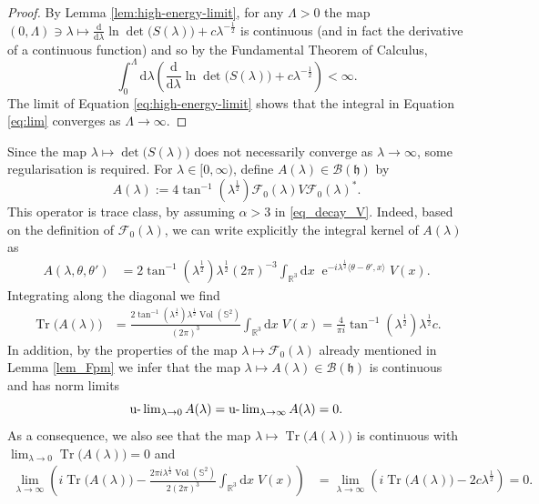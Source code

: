 \documentclass{article}
\def\B{\mathscr B}
\def\d{\mathrm{d}}
\def\F{\mathscr F}
\def\R{\mathbb R}
\def\S{\mathbb S}
\def\HS{\mathfrak h}
\def\e{\mathop{\mathrm{e}}\nolimits}
\def\ulim{\mathop{\hbox{\rm u-}\lim}\nolimits}
\def\Tr{\mathop{\mathrm{Tr}}\nolimits}
\def\vol{\mathop{\mathrm{Vol}}\nolimits}
\begin{document}
\begin{proof}
By Lemma \ref{lem:high-energy-limit}, for any $\Lambda > 0$ the map $(0,\Lambda) \ni \lambda \mapsto \frac{\d}{\d \lambda} \ln\det\big(S(\lambda)\big) + c \lambda^{-\frac12}$ is continuous (and in fact the derivative of a continuous function) and so by the Fundamental Theorem of Calculus,
\begin{equation}\label{eq:lim}
\int_0^\Lambda \d \lambda \left(\frac{\d}{\d \lambda} \ln\det\big(S(\lambda)\big) + c \lambda^{-\frac12} \right) < \infty.
\end{equation}
The limit of Equation \eqref{eq:high-energy-limit} shows that the integral in Equation \eqref{eq:lim} converges as $\Lambda \to \infty$.
\end{proof}

Since the map $\lambda \mapsto \det\big(S(\lambda)\big)$ does not necessarily converge as $\lambda \to \infty$, some regularisation is required. For $\lambda \in [0,\infty)$, define $A(\lambda) \in \B(\HS)$ by
\begin{equation*}
A(\lambda) := 4 \tan^{-1}(\lambda^\frac12) \F_0(\lambda) V \F_0(\lambda)^*.
\end{equation*}
This operator is trace class, by assuming $\alpha > 3$ in \eqref{eq_decay_V}.
Indeed, based on the definition of $\F_0(\lambda)$, we can write explicitly the integral kernel of $A(\lambda)$ as
\begin{align*}
A(\lambda,\theta,\theta') &= 2 \tan^{-1}(\lambda^\frac12 ) \lambda^\frac12 (2\pi)^{-3}  \int_{\R^3}  
\d x\;\!\e^{-i \lambda^\frac12 \langle \theta - \theta', x \rangle } V(x)  .
\end{align*}
Integrating along the diagonal we find
\begin{align*}
\Tr\big(A(\lambda)\big) &= \frac{2 \tan^{-1}(\lambda^\frac12) \lambda^\frac12 \vol(\S^2)}{(2\pi)^3} \int_{\R^3} \d x\;\!V(x)  
= \frac{4}{\pi i} \tan^{-1}(\lambda^\frac12) \lambda^\frac12 c.
\end{align*}
In addition, by the properties of the map $\lambda \mapsto \F_0(\lambda)$  already mentioned in Lemma \ref{lem_Fpm} we infer that the map $\lambda \mapsto A(\lambda) \in \B(\HS)$ is continuous and has norm limits 
$$
\ulim_{\lambda \to 0} A(\lambda) = \ulim_{\lambda \to \infty} A(\lambda) = 0. 
$$
As a consequence, we also see that the map $\lambda \mapsto \Tr\big(A(\lambda)\big)$ is continuous with $\lim_{\lambda \to 0} \Tr\big(A(\lambda)\big) = 0$ and 
\begin{align}\label{eq:det-limits}
\lim_{\lambda \to \infty} \left( i \Tr\big(A(\lambda)\big) - \frac{2\pi i \lambda^{\frac12} \vol(\S^2)}{2(2\pi)^3} \int_{\R^3} \d x\;\!V(x)  \right) &= \lim_{\lambda \to \infty} \left( i \Tr\big(A(\lambda)\big) - 2 c \lambda^\frac12 \right) = 0.
\end{align}
\end{document}

